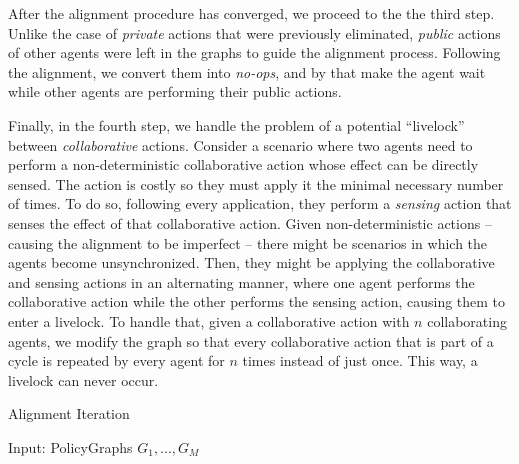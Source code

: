 \documentclass[letterpaper]{article} %
\begin{document}
After the alignment procedure has converged, we proceed to the the third step. Unlike the case of \emph{private} actions that were previously eliminated, \emph{public} actions of other agents were left in the graphs to guide the alignment process. Following the alignment, we convert them into \emph{no-ops}, and by that make the agent wait while other agents are performing their public actions.

Finally, in the fourth step, we handle the problem of a potential ``livelock''
between \emph{collaborative} actions. Consider a scenario where two agents need to perform a non-deterministic collaborative action whose effect can be directly sensed. The action is costly so they must apply it the minimal necessary number of times. To do so, following every application, they perform a \emph{sensing} action that senses the effect of that collaborative action.
Given non-deterministic actions -- causing the alignment to be imperfect -- there might be scenarios in which the agents become unsynchronized. Then, they might be applying the collaborative and sensing actions in an alternating manner, where one agent performs the collaborative action while the other performs the sensing action, causing them to enter a livelock. To handle that, given a collaborative action with $n$ collaborating agents, we modify the graph so that every collaborative action that is part of a cycle is repeated by every agent for $n$ times instead of just once. This way, a livelock can never occur.

\begin{algorithm}
\caption{Alignment Iteration}
\begin{algorithmic}[tbph]
\State Input: PolicyGraphs $G_1, ..., G_M$
	\EndFor
	\EndIf
	\EndWhile
\EndFor
{}
\end{algorithmic}
\end{algorithm}
\end{document}
